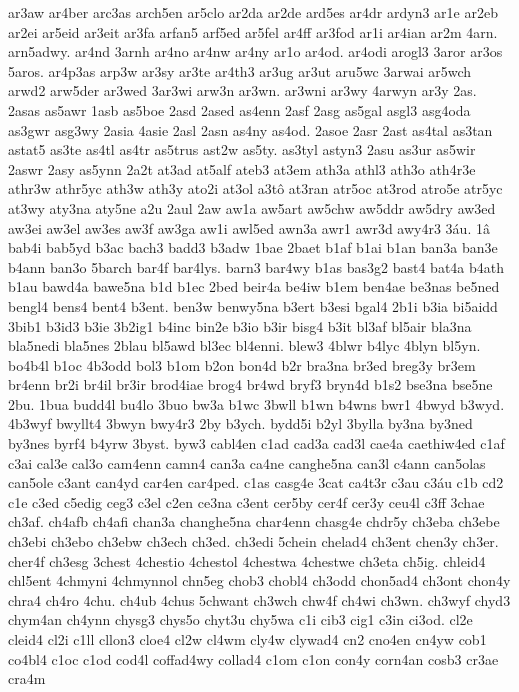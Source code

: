 {ar3aw
ar4ber
arc3as
arch5en
ar5clo
ar2da
ar2de
ard5es
ar4dr
ardyn3
ar1e
ar2eb
ar2ei
ar5eid
ar3eit
ar3fa
arfan5
arf5ed
ar5fel
ar4ff
ar3fod
ar1i
ar4ian
ar2m
4arn.
arn5adwy.
ar4nd
3arnh
ar4no
ar4nw
ar4ny
ar1o
ar4od.
ar4odi
arogl3
3aror
ar3os
5aros.
ar4p3as
arp3w
ar3sy
ar3te
ar4th3
ar3ug
ar3ut
aru5wc
3arwai
ar5wch
arwd2
arw5der
ar3wed
3ar3wi
arw3n
ar3wn.
ar3wni
ar3wy
4arwyn
ar3y
2as.
2asas
as5awr
1asb
as5boe
2asd
2ased
as4enn
2asf
2asg
as5gal
asgl3
asg4oda
as3gwr
asg3wy
2asia
4asie
2asl
2asn
as4ny
as4od.
2asoe
2asr
2ast
as4tal
as3tan
astat5
as3te
as4tl
as4tr
as5trus
ast2w
as5ty.
as3tyl
astyn3
2asu
as3ur
as5wir
2aswr
2asy
as5ynn
2a2t
at3ad
at5alf
ateb3
at3em
ath3a
athl3
ath3o
ath4r3e
athr3w
athr5yc
ath3w
ath3y
ato2i
at3ol
a3t^^f4
at3ran
atr5oc
at3rod
atro5e
atr5yc
at3wy
aty3na
aty5ne
a2u
2aul
2aw
aw1a
aw5art
aw5chw
aw5ddr
aw5dry
aw3ed
aw3ei
aw3el
aw3es
aw3f
aw3ga
aw1i
awl5ed
awn3a
awr1
awr3d
awy4r3
3^^e1u.
1^^e2
bab4i
bab5yd
b3ac
bach3
badd3
b3adw
1bae
2baet
b1af
b1ai
b1an
ban3a
ban3e
b4ann
ban3o
5barch
bar4f
bar4lys.
barn3
bar4wy
b1as
bas3g2
bast4
bat4a
b4ath
b1au
bawd4a
bawe5na
b1d
b1ec
2bed
beir4a
be4iw
b1em
ben4ae
be3nas
be5ned
bengl4
bens4
bent4
b3ent.
ben3w
benwy5na
b3ert
b3esi
bgal4
2b1i
b3ia
bi5aidd
3bib1
b3id3
b3ie
3b2ig1
b4inc
bin2e
b3io
b3ir
bisg4
b3it
bl3af
bl5air
bla3na
bla5nedi
bla5nes
2blau
bl5awd
bl3ec
bl4enni.
blew3
4blwr
b4lyc
4blyn
bl5yn.
bo4b4l
b1oc
4b3odd
bol3
b1om
b2on
bon4d
b2r
bra3na
br3ed
breg3y
br3em
br4enn
br2i
br4il
br3ir
brod4iae
brog4
br4wd
bryf3
bryn4d
b1s2
bse3na
bse5ne
2bu.
1bua
budd4l
bu4lo
3buo
bw3a
b1wc
3bwll
b1wn
b4wns
bwr1
4bwyd
b3wyd.
4b3wyf
bwyllt4
3bwyn
bwy4r3
2by
b3ych.
bydd5i
b2yl
3bylla
by3na
by3ned
by3nes
byrf4
b4yrw
3byst.
byw3
cabl4en
c1ad
cad3a
cad3l
cae4a
caethiw4ed
c1af
c3ai
cal3e
cal3o
cam4enn
camn4
can3a
ca4ne
canghe5na
can3l
c4ann
can5olas
can5ole
c3ant
can4yd
car4en
car4ped.
c1as
casg4e
3cat
ca4t3r
c3au
c3^^e1u
c1b
cd2
c1e
c3ed
c5edig
ceg3
c3el
c2en
ce3na
c3ent
cer5by
cer4f
cer3y
ceu4l
c3ff
3chae
ch3af.
ch4afb
ch4afi
chan3a
changhe5na
char4enn
chasg4e
chdr5y
ch3eba
ch3ebe
ch3ebi
ch3ebo
ch3ebw
ch3ech
ch3ed.
ch3edi
5chein
chelad4
ch3ent
chen3y
ch3er.
cher4f
ch3esg
3chest
4chestio
4chestol
4chestwa
4chestwe
ch3eta
ch5ig.
chleid4
chl5ent
4chmyni
4chmynnol
chn5eg
chob3
chobl4
ch3odd
chon5ad4
ch3ont
chon4y
chra4
ch4ro
4chu.
ch4ub
4chus
5chwant
ch3wch
chw4f
ch4wi
ch3wn.
ch3wyf
chyd3
chym4an
ch4ynn
chysg3
chys5o
chyt3u
chy5wa
c1i
cib3
cig1
c3in
ci3od.
cl2e
cleid4
cl2i
c1ll
cllon3
cloe4
cl2w
cl4wm
cly4w
clywad4
cn2
cno4en
cn4yw
cob1
co4bl4
c1oc
c1od
cod4l
coffad4wy
collad4
c1om
c1on
con4y
corn4an
cosb3
cr3ae
cra4m
}
